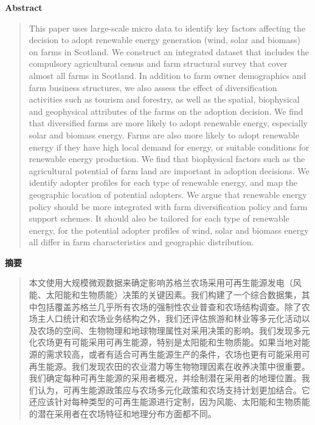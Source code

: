 \vspace{1.5em}
\noindent\textbf{Abstract}\par
\begin{quote}\small
This paper uses large-scale micro data to identify key factors affecting the decision to adopt renewable energy generation (wind, solar and biomass) on farms in Scotland. We construct an integrated dataset that includes the compulsory agricultural census and farm structural survey that cover almost all farms in Scotland. In addition to farm owner demographics and farm business structures, we also assess the effect of diversification activities such as tourism and forestry, as well as the spatial, biophysical and geophysical attributes of the farms on the adoption decision. We find that diversified farms are more likely to adopt renewable energy, especially solar and biomass energy. Farms are also more likely to adopt renewable energy if they have high local demand for energy, or suitable conditions for renewable energy production. We find that biophysical factors such as the agricultural potential of farm land are important in adoption decisions. We identify adopter profiles for each type of renewable energy, and map the geographic location of potential adopters. We argue that renewable energy policy should be more integrated with farm diversification policy and farm support schemes. It should also be tailored for each type of renewable energy, for the potential adopter profiles of wind, solar and biomass energy all differ in farm characteristics and geographic distribution.
\end{quote}

\noindent\textbf{摘要}\par
\begin{quote}\small
本文使用大规模微观数据来确定影响苏格兰农场采用可再生能源发电（风能、太阳能和生物质能）决策的关键因素。我们构建了一个综合数据集，其中包括覆盖苏格兰几乎所有农场的强制性农业普查和农场结构调查。除了农场主人口统计和农场业务结构之外，我们还评估旅游和林业等多元化活动以及农场的空间、生物物理和地球物理属性对采用决策的影响。我们发现多元化农场更有可能采用可再生能源，特别是太阳能和生物质能。如果当地对能源的需求较高，或者有适合可再生能源生产的条件，农场也更有可能采用可再生能源。我们发现农田的农业潜力等生物物理因素在收养决策中很重要。我们确定每种可再生能源的采用者概况，并绘制潜在采用者的地理位置。我们认为，可再生能源政策应与农场多元化政策和农场支持计划更加结合。它还应该针对每种类型的可再生能源进行定制，因为风能、太阳能和生物质能的潜在采用者在农场特征和地理分布方面都不同。
\end{quote}

